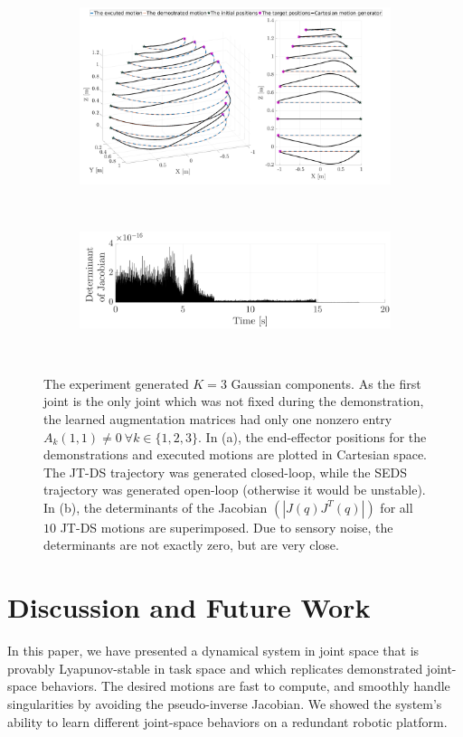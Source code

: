 \documentclass[letterpaper, 10 pt, conference,fleqn]{ieeeconf}
\begin{document}
\begin{figure}[t]
	\begin{subfigure}[t]{\linewidth}
		\includegraphics[width=\linewidth]{Pic/cropped_Sing_1.pdf}
		\caption{ }
		\label{fig:Sin}
	\end{subfigure}\\
	\begin{subfigure}[t]{\linewidth}
		\includegraphics[width=\linewidth]{Pic/cropped_Sing_2.pdf}
		\caption{ }
		\label{fig:Det}
	\end{subfigure}\\
	\caption{The experiment generated $K=3$ Gaussian components. As the first joint is the only joint which was not fixed during the demonstration, the learned augmentation matrices had only one nonzero entry $A_k(1,1)\neq0~\forall k\in \{1, 2, 3\} $.  In (a), the end-effector positions for the demonstrations and executed motions are plotted in Cartesian space. The JT-DS trajectory was generated closed-loop, while the SEDS trajectory was generated open-loop (otherwise it would be unstable). In (b), the determinants of the Jacobian $(|J(q)J^T(q)|)$ for all $10$ JT-DS motions are superimposed. Due to sensory noise, the determinants are not exactly zero, but are very close.  }
	\vspace{-10pt}
\end{figure}

\section{Discussion and Future Work} 
\label{Sec:Dis}
In this paper, we have presented a dynamical system in joint space that is provably Lyapunov-stable in task space and which replicates demonstrated joint-space behaviors. The desired motions are fast to compute, and smoothly handle singularities by avoiding the pseudo-inverse Jacobian. We showed the system's ability to learn different joint-space behaviors on a redundant robotic platform.
\end{document}
